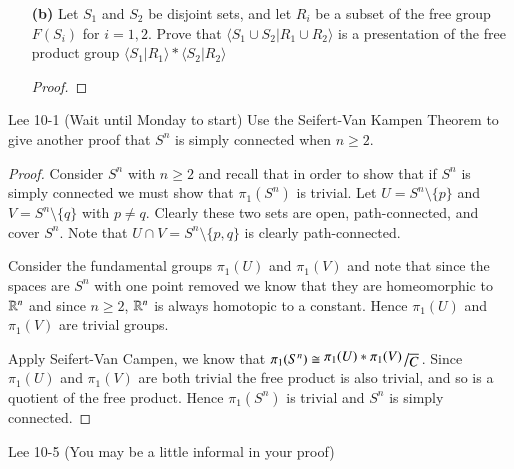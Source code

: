 \documentclass{homework651}
\newcommand{\bigslant}[2]{{\raisebox{.2em}{$#1$}\left/\raisebox{-.2em}{$#2$}\right.}}
\begin{document}
\begin{problems}
\begin{enumerate}
        
        \item[\textbf{(b)}] Let $S_1$ and $S_2$ be disjoint sets, and let $R_i$ be a subset of the free group $F(S_i)$ for $i = 1, 2$. Prove that $\langle S_1 \cup S_2 | R_1 \cup R_2 \rangle$ is a presentation of the free product group $\langle S_1|R_1  \rangle \ast \langle S_2|R_2  \rangle$
        \begin{proof}



        \end{proof}








    \end{enumerate}








    \problem Lee 10-1 (Wait until Monday to start) Use the Seifert-Van Kampen Theorem to give another proof that $S^n$ is simply connected when $n \geq 2$. 
    \begin{proof} Consider $S^n$ with $n \geq 2$ and recall that in order to show that if $S^n$ is simply connected 
        we must show that $\pi_1(S^n)$ is trivial. Let $U = S^n \setminus \{p\}$ and $V = S^n \setminus \{q\}$ with $p \neq q$. Clearly these two sets are open, path-connected, and cover $S^n$. Note that $U \cap V = S^n \setminus \{p, q\}$ is clearly path-connected. 

        Consider the fundamental groups $\pi_1(U)$ and $\pi_1(V)$ and note that since the spaces are $S^n$ with one point removed we know that they are homeomorphic to $\mathbb R^{n}$ and since $n \geq 2$, $\mathbb R^{n}$ is always homotopic to a constant. Hence $\pi_1(U)$ and $\pi_1(V)$
        are trivial groups.

        Apply Seifert-Van Campen, we know that $\pi_1(S^n) \cong \bigslant{\pi_1(U) \ast \pi_1(V)}{\overline{C}}$. Since $\pi_1(U)$ and $\pi_1(V)$ are both trivial the free product is also trivial, and so is a quotient of the free product. Hence $\pi_1(S^n)$ is trivial and $S^n$ is simply connected.  




        
    \end{proof}





    \problem Lee 10-5 (You may be a little informal in your proof)




\end{problems}
\end{document}
